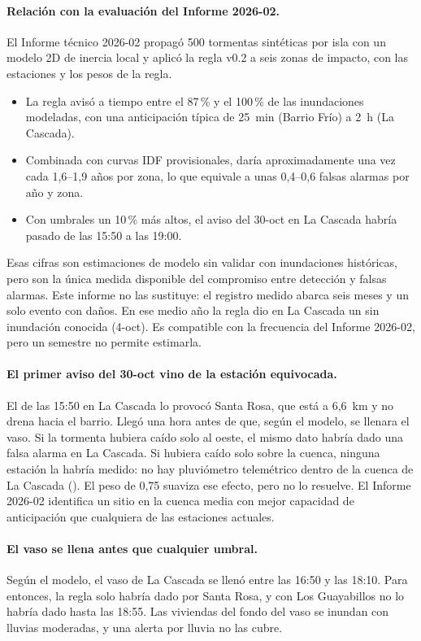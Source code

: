 \documentclass{sosg-informe}
\begin{document}
\paragraph{Relación con la evaluación del Informe 2026-02.} El Informe técnico 2026-02 \citep{maya2026idf} propagó 500 tormentas sintéticas por isla con un modelo 2D de inercia local y aplicó la regla v0.2 a seis zonas de impacto, con las estaciones y los pesos de la regla.
\begin{itemize}
  \item La regla avisó a tiempo entre el 87\,\% y el 100\,\% de las inundaciones modeladas, con una anticipación típica de 25~min (Barrio Frío) a 2~h (La Cascada).
  \item Combinada con curvas IDF provisionales, daría \alto{} aproximadamente una vez cada 1,6--1,9 años por zona, lo que equivale a unas 0,4--0,6 falsas alarmas por año y zona.
  \item Con umbrales un 10\,\% más altos, el aviso del 30-oct en La Cascada habría pasado de las 15:50 a las 19:00.
\end{itemize}
Esas cifras son estimaciones de modelo sin validar con inundaciones históricas, pero son la única medida disponible del compromiso entre detección y falsas alarmas. Este informe no las sustituye: el registro medido abarca seis meses y un solo evento con daños. En ese medio año la regla dio en La Cascada un \alto{} sin inundación conocida (4-oct). Es compatible con la frecuencia del Informe 2026-02, pero un semestre no permite estimarla.

\paragraph{El primer aviso del 30-oct vino de la estación equivocada.} El \alto{} de las 15:50 en La Cascada lo provocó Santa Rosa, que está a 6,6~km y no drena hacia el barrio. Llegó una hora antes de que, según el modelo, se llenara el vaso. Si la tormenta hubiera caído solo al oeste, el mismo dato habría dado una falsa alarma en La Cascada. Si hubiera caído solo sobre la cuenca, ninguna estación la habría medido: no hay pluviómetro telemétrico dentro de la cuenca de La Cascada (). El peso de 0,75 suaviza ese efecto, pero no lo resuelve. El Informe 2026-02 identifica un sitio en la cuenca media con mejor capacidad de anticipación que cualquiera de las estaciones actuales.

\paragraph{El vaso se llena antes que cualquier umbral.} Según el modelo, el vaso de La Cascada se llenó entre las 16:50 y las 18:10. Para entonces, la regla solo habría dado \alto{} por Santa Rosa, y con Los Guayabillos no lo habría dado hasta las 18:55. Las viviendas del fondo del vaso se inundan con lluvias moderadas, y una alerta por lluvia no las cubre.
\end{document}

